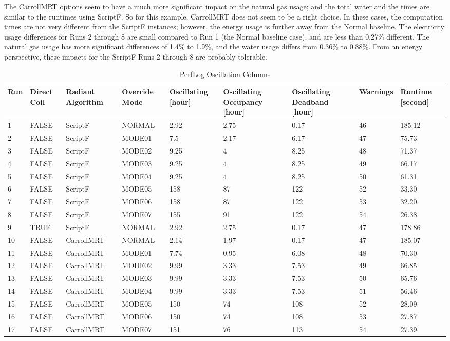 The CarrollMRT options seem to have a much more significant impact on the natural gas usage; and the total water and the times are similar to the runtimes using ScriptF. So for this example, CarrollMRT does not seem to be a right choice. In these cases, the computation times are not very different from the ScriptF instances; however, the energy usage is further away from the Normal baseline. The electricity usage differences for Runs 2 through 8 are small compared to Run 1 (the Normal baseline case), and are less than 0.27\% different. The natural gas usage has more significant differences of 1.4\% to 1.9\%, and the water usage differs from 0.36\% to 0.88\%. From an energy perspective, these impacts for the ScriptF Runs 2 through 8 are probably tolerable.

{\scriptsize
\begin{longtable}[c]{p{0.2in}p{0.4in}p{0.55in}p{0.7in}p{0.5in}p{0.6in}p{0.7in}p{0.6in}p{0.6in}}
\caption{PerfLog Oscillation Columns\label{table:perflog_oscillation_columns}} \tabularnewline
\toprule
Run &
Direct Coil &
Radiant Algorithm &
Override Mode &
  Oscillating {[}hour{]} &
  Oscillating Occupancy {[}hour{]} &
  Oscillating Deadband {[}hour{]} &
  Warnings &
  Runtime {[}second{]} \tabularnewline
\midrule
\endfirsthead

1  & FALSE & ScriptF    & NORMAL & 2.92	 & 2.75	 & 0.17	 & 46 &	185.12 \tabularnewline
2  & FALSE & ScriptF    & MODE01 & 7.5	 & 2.17	 & 6.17	 & 47 &	75.73  \tabularnewline
3  & FALSE & ScriptF    & MODE02 & 9.25	 & 4	 & 8.25	 & 48 &	71.37  \tabularnewline
4  & FALSE & ScriptF    & MODE03 & 9.25	 & 4	 & 8.25	 & 49 & 66.17  \tabularnewline
5  & FALSE & ScriptF    & MODE04 & 9.25	 & 4	 & 8.25	 & 50 &	61.31  \tabularnewline
6  & FALSE & ScriptF    & MODE05 & 158	 & 87	 & 122	 & 52 &	33.30  \tabularnewline
7  & FALSE & ScriptF    & MODE06 & 158	 & 87	 & 122	 & 53 &	32.20  \tabularnewline
8  & FALSE & ScriptF    & MODE07 & 155	 & 91	 & 122	 & 54 &	26.38  \tabularnewline
9  & TRUE  & ScriptF    & NORMAL & 2.92	 & 2.75	 & 0.17	 & 47 & 178.86 \tabularnewline
10 & FALSE & CarrollMRT & NORMAL & 2.14	 & 1.97	 & 0.17	 & 47 &	185.07 \tabularnewline
11 & FALSE & CarrollMRT & MODE01 & 7.74	 & 0.95	 & 6.08	 & 48 &	70.30  \tabularnewline
12 & FALSE & CarrollMRT & MODE02 & 9.99	 & 3.33	 & 7.53	 & 49 &	66.85  \tabularnewline
13 & FALSE & CarrollMRT & MODE03 & 9.99	 & 3.33	 & 7.53	 & 50 &	65.76  \tabularnewline
14 & FALSE & CarrollMRT & MODE04 & 9.99	 & 3.33	 & 7.53	 & 51 &	56.46  \tabularnewline
15 & FALSE & CarrollMRT & MODE05 & 150	 & 74	 & 108	 & 52 &	28.09  \tabularnewline
16 & FALSE & CarrollMRT & MODE06 & 150	 & 74	 & 108	 & 53 &	27.87  \tabularnewline
17 & FALSE & CarrollMRT & MODE07 & 151	 & 76	 & 113	 & 54 &	27.39  \tabularnewline

\bottomrule
\end{longtable}
}

